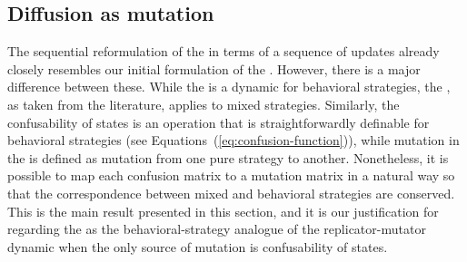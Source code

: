 \documentclass[fleqn,reqno,10pt]{article}
\newcommand{\rmd}{\acro{rmd}} %
\newcommand{\rdd}{\acro{rdd}} %
\begin{document}
\subsection{Diffusion as mutation}
\label{sec:diffusion-as-special}

The sequential reformulation of the \rmd in terms of a sequence of
updates already closely resembles our initial formulation of the
\rdd. However, there is a major difference between these. While the
\rdd is a dynamic for behavioral strategies, the \rmd, as taken from
the literature, applies to mixed strategies. Similarly, the
confusability of states is an operation that is straightforwardly
definable for behavioral strategies (see
Equations~(\ref{eq:confusion-function})), while mutation in the \rmd
is defined as mutation from one pure strategy to another. Nonetheless,
it is possible to map each confusion matrix to a mutation matrix in a
natural way so that the correspondence between mixed and behavioral
strategies are conserved. This is the main result presented in this
section, and it is our justification for regarding the \rdd as the
behavioral-strategy analogue of the replicator-mutator dynamic when
the only source of mutation is confusability of states.
\end{document}
